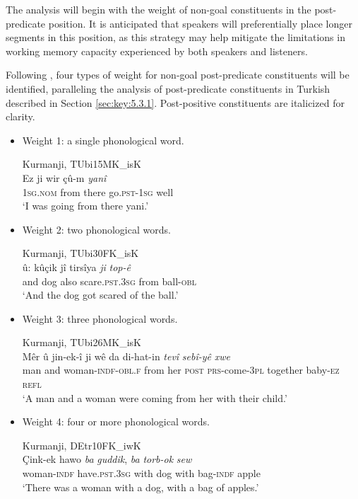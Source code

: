 The analysis will begin with the weight of non-goal constituents in the post-predicate position. It is anticipated that speakers will preferentially place longer segments in this position, as this strategy may help mitigate the limitations in working memory capacity experienced by both speakers and listeners.

Following \citep{Haignforth}, four types of weight for non-goal post-predicate constituents will be identified, paralleling the analysis of post-predicate constituents in Turkish described in Section \ref{sec:key:5.3.1}. Post-positive constituents are italicized for clarity.

\begin{itemize}
\item Weight 1: a single phonological word.

\ea
  \label{ex:key:80} Kurmanji, TUbi15MK\_isK \\
     \gll Ez     ji   wir   çû-m     \textit{yanî}\\
\textsc{1sg.nom}  from  there  go\textsc{.pst-1sg}  well\\
\glt ‘I was going from there yani.’
  \z


\item{Weight 2:} two phonological words.

\ea%
  \label{ex:key:81} Kurmanji, TUbi30FK\_isK \\
     \gll û:   kûçik   jî   tirsîya     \textit{ji}   \textit{top-ê} \\
and  dog  also  scare\textsc{.pst.3sg}  from  ball-\textsc{obl}  \\
\glt ‘And the dog got scared of the ball.’ 
  \z


\item{Weight 3:} three phonological words.

\ea%
  \label{ex:key:82} Kurmanji, TUbi26MK\_isK \\
     \gll Mêr   û   jin-ek-î     ji   wê   da   di-hat-in \textit{tevî}     \textit{sebî-yê}     \textit{xwe}\\
man  and  woman-\textsc{indf-obl.f}  from  her  \textsc{post}  \textsc{prs}-come-\textsc{3pl} together  baby-\textsc{ez}  \textsc{refl}\\
\glt ‘A man and a woman were coming from her with their child.’  
  \z


\item{Weight 4:} four or more phonological words.

\ea%
  \label{ex:key:83} Kurmanji, DEtr10FK\_iwK \\
     \gll Çink-ek   hawo     \textit{ba}   \textit{guddik}, \textit{ba}   \textit{torb-ok}  \textit{sew}\\
woman\textsc{-indf}  have\textsc{.pst.3sg}  with  dog   with  bag-\textsc{indf}  apple\\
\glt ‘There was a woman with a dog, with a bag of apples.’ 
  \z

\end{itemize}

